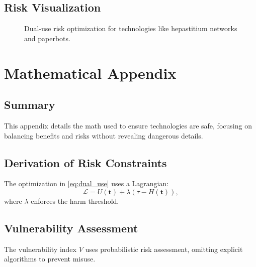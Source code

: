\documentclass[11pt,oneside]{memoir}
\theoremstyle{plain}
\newcommand{\R}{\mathbb{R}}
\begin{document}
\subsection{Risk Visualization}
\begin{figure}[h]
    \centering
    \caption{Dual-use risk optimization for technologies like hepastitium networks and paperbots.}
    \label{fig:dual_use_risk}
\end{figure}

\section{Mathematical Appendix}
\subsection{Summary}
This appendix details the math used to ensure technologies are safe, focusing on balancing benefits and risks without revealing dangerous details.

\subsection{Derivation of Risk Constraints}
The optimization in \eqref{eq:dual_use} uses a Lagrangian:
\begin{equation}
    \mathcal{L} = U(\mathbf{t}) + \lambda (\tau - H(\mathbf{t})),
\end{equation}
where \(\lambda\) enforces the harm threshold.

\subsection{Vulnerability Assessment}
The vulnerability index \(V\) uses probabilistic risk assessment, omitting explicit algorithms to prevent misuse.
\end{document}
